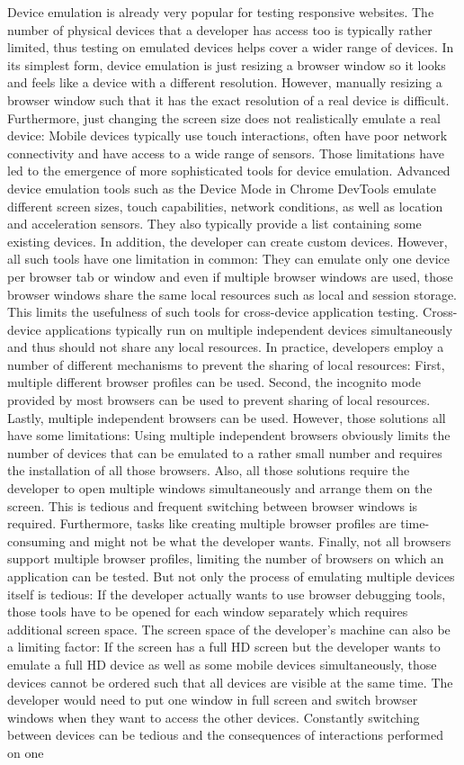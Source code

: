Device emulation is already very popular for testing responsive websites. The number of physical devices that a developer has access too is typically rather limited, thus testing on emulated devices helps cover a wider range of devices. In its simplest form, device emulation is just resizing a browser window so it looks and feels like a device with a different resolution. However, manually resizing a browser window such that it has the exact resolution of a real device is difficult. Furthermore, just changing the screen size does not realistically emulate a real device: Mobile devices typically use touch interactions, often have poor network connectivity and have access to a wide range of sensors. Those limitations have led to the emergence of more sophisticated tools for device emulation. Advanced device emulation tools such as the Device Mode in Chrome DevTools emulate different screen sizes, touch capabilities, network conditions, as well as location and acceleration sensors. They also typically provide a list containing some existing devices. In addition, the developer can create custom devices. However, all such tools have one limitation in common: They can emulate only one device per browser tab or window and even if multiple browser windows are used, those browser windows share the same local resources such as local and session storage. This limits the usefulness of such tools for cross-device application testing. Cross-device applications typically run on multiple independent devices simultaneously and thus should not share any local resources. In practice, developers employ a number of different mechanisms to prevent the sharing of local resources: First, multiple different browser profiles can be used. Second, the incognito mode provided by most browsers can be used to prevent sharing of local resources. Lastly, multiple independent browsers can be used. However, those solutions all have some limitations: Using multiple independent browsers obviously limits the number of devices that can be emulated to a rather small number and requires the installation of all those browsers. Also, all those solutions require the developer to open multiple windows simultaneously and arrange them on the screen. This is tedious and frequent switching between browser windows is required. Furthermore, tasks like creating multiple browser profiles are time-consuming and might not be what the developer wants. Finally, not all browsers support multiple browser profiles, limiting the number of browsers on which an application can be tested. But not only the process of emulating multiple devices itself is tedious: If the developer actually wants to use browser debugging tools, those tools have to be opened for each window separately which requires additional screen space. The screen space of the developer's machine can also be a limiting factor: If the screen has a full HD screen but the developer wants to emulate a full HD device as well as some mobile devices simultaneously, those devices cannot be ordered such that all devices are visible at the same time. The developer would need to put one window in full screen and switch browser windows when they want to access the other devices. Constantly switching between devices can be tedious and the consequences of interactions performed on one 